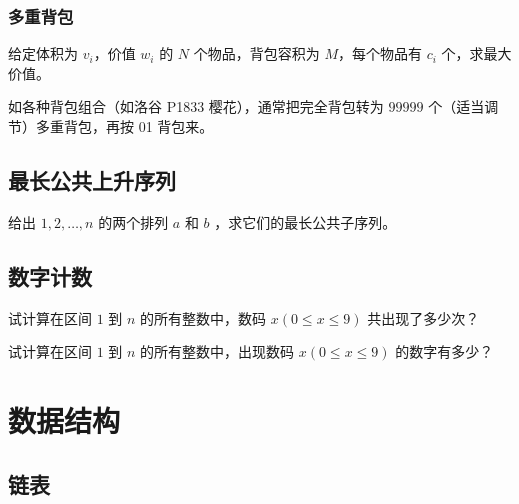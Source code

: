 \documentclass{probook}
\begin{document}
\begin{multicols}{2}


\subsection{多重背包}

给定体积为 $v_i$，价值 $w_i$ 的 $N$ 个物品，背包容积为 $M$，每个物品有 $c_i$ 个，求最大价值。

如各种背包组合（如洛谷 P1833 樱花），通常把完全背包转为 $99999$ 个（适当调节）多重背包，再按 01 背包来。



\section{最长公共上升序列}

给出 $1,2,\ldots,n$ 的两个排列 $a$ 和 $b$ ，求它们的最长公共子序列。



\section{数字计数}

试计算在区间 $1$ 到 $n$ 的所有整数中，数码 $x(0 \leqslant x \leqslant 9)$ 共出现了多少次？



试计算在区间 $1$ 到 $n$ 的所有整数中，出现数码 $x(0 \leqslant x \leqslant 9)$ 的数字有多少？









\chapter{数据结构}

\section{链表}




\end{multicols}
\end{document}
